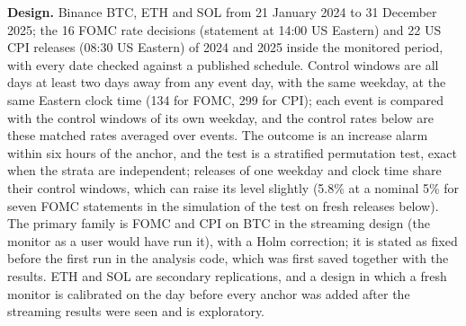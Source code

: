 \documentclass[
]{article}
\begin{document}
\textbf{Design.} Binance BTC, ETH and SOL from 21 January 2024 to 31
December 2025; the 16 FOMC rate decisions (statement at 14:00 US
Eastern) and 22 US CPI releases (08:30 US Eastern) of 2024 and 2025
inside the monitored period, with every date checked against a published
schedule. Control windows are all days at least two days away from any
event day, with the same weekday, at the same Eastern clock time (134
for FOMC, 299 for CPI); each event is compared with the control windows
of its own weekday, and the control rates below are these matched rates
averaged over events. The outcome is an increase alarm within six hours
of the anchor, and the test is a stratified permutation test, exact when
the strata are independent; releases of one weekday and clock time share
their control windows, which can raise its level slightly (5.8\% at a
nominal 5\% for seven FOMC statements in the simulation of the test on
fresh releases below). The primary family is FOMC and CPI on BTC in the
streaming design (the monitor as a user would have run it), with a Holm
correction; it is stated as fixed before the first run in the analysis
code, which was first saved together with the results. ETH and SOL are
secondary replications, and a design in which a fresh monitor is
calibrated on the day before every anchor was added after the streaming
results were seen and is exploratory.
\end{document}
